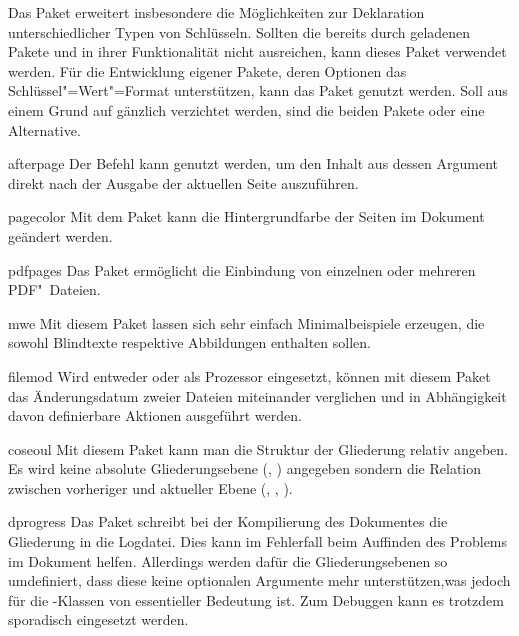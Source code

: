 \begin{packages}
  Das Paket  erweitert insbesondere die Möglichkeiten zur 
  Deklaration unterschiedlicher Typen von Schlüsseln. Sollten die bereits durch 
  \TUDScript geladenen Pakete  und  in ihrer 
  Funktionalität nicht ausreichen, kann dieses Paket verwendet werden. Für die 
  Entwicklung eigener Pakete, deren Optionen das Schlüssel"=Wert"=Format 
  unterstützen, kann das Paket  genutzt werden. Soll aus einem 
  Grund auf \KOMAScript{} gänzlich verzichtet werden, sind die beiden Pakete 
   oder  eine Alternative.
\item[afterpage]
  Der Befehl \Parameter{\dots} kann genutzt werden, um den 
  Inhalt aus dessen Argument direkt nach der Ausgabe der aktuellen Seite 
  auszuführen.
\item[pagecolor]%
  Mit dem Paket kann die Hintergrundfarbe der Seiten im Dokument geändert 
  werden.
\item[pdfpages]
  Das Paket ermöglicht die Einbindung von einzelnen oder mehreren PDF"~Dateien.
\item[mwe]%
  Mit diesem Paket lassen sich sehr einfach Minimalbeispiele erzeugen, die 
  sowohl Blindtexte respektive Abbildungen enthalten sollen.
\item[filemod]
  Wird entweder  oder  als Prozessor 
  eingesetzt, können mit diesem Paket das Änderungsdatum zweier Dateien 
  miteinander verglichen und in Abhängigkeit davon definierbare Aktionen 
  ausgeführt werden.
\item[coseoul]
  Mit diesem Paket kann man die Struktur der Gliederung relativ angeben. Es 
  wird keine absolute Gliederungsebene (, ) 
  angegeben sondern die Relation zwischen vorheriger und aktueller Ebene 
  (, , ).
\item[dprogress]%
  Das Paket schreibt bei der Kompilierung des Dokumentes die Gliederung in die 
  Logdatei. Dies kann im Fehlerfall beim Auffinden des Problems im Dokument 
  helfen. Allerdings werden dafür die Gliederungsebenen so umdefiniert, dass 
  diese keine optionalen Argumente mehr unterstützen,was jedoch für die 
  \TUDScript-Klassen von essentieller Bedeutung ist. Zum Debuggen kann es 
  trotzdem sporadisch eingesetzt werden.
\end{packages}

